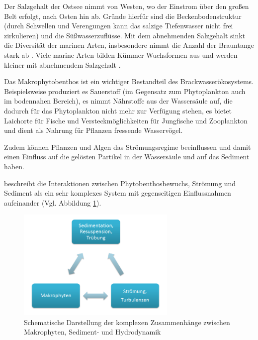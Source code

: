 Der Salzgehalt der Ostsee nimmt von Westen, wo der Einstrom über den großen Belt erfolgt, nach Osten hin ab. Gründe hierfür sind die Beckenbodenstruktur (durch Schwellen und Verengungen kann das salzige Tiefenwasser nicht frei zirkulieren) und die Süßwasserzuflüsse. Mit dem abnehmenden Salzgehalt sinkt die Diversität der marinen Arten, insbesondere nimmt die Anzahl der Brauntange stark ab \citep{schwenke_1995}. Viele marine Arten bilden Kümmer-Wuchsformen aus und werden kleiner mit abnehmendem Salzgehalt \citep{schwenke_1995}.

Das Makrophytobenthos ist ein wichtiger Bestandteil des Brackwasserökosystems. Beispielsweise produziert es Sauerstoff (im  Gegensatz zum Phytoplankton auch im bodennahen Bereich), es nimmt Nährstoffe aus der Wassersäule auf, die dadurch für das Phytoplankton nicht mehr zur Verfügung stehen, es bietet Laichorte für Fische und Versteckmöglichkeiten für Jungfische und Zooplankton und dient als Nahrung für Pflanzen fressende Wasservögel.

Zudem können Pflanzen und Algen das Strömungsregime beeinflussen \citep{leonard_2006, li_2014, hurd_1997, siniscalchi_2012} und damit einen Einfluss auf die gelösten Partikel in der Wassersäule \citep{horppila_2003, leonard_1997, leonard_2006, ward_1984} und auf das Sediment \citep{madsen_2001} haben. 

\citep{madsen_2001} beschreibt die Interaktionen zwischen Phytobenthosbewuchs, Strömung und Sediment als ein sehr komplexes System mit gegenseitigen Einflussnahmen aufeinander (Vgl. Abbildung \ref{fig:schema_Makrophyten,Sedimente,Hydrodynamik}).


\begin{figure}[htb]
\centering
\includegraphics[width=0.68\textwidth]{images/Schema_Pfl_Sedim_Strm}
\caption[Zusammenhänge zwischen Makrophyten, Sediment- und Hydrodynamik]{Schematische Darstellung der komplexen Zusammenhänge zwischen Makrophyten, Sediment- und Hydrodynamik}
\label{fig:schema_Makrophyten,Sedimente,Hydrodynamik}
\end{figure}


